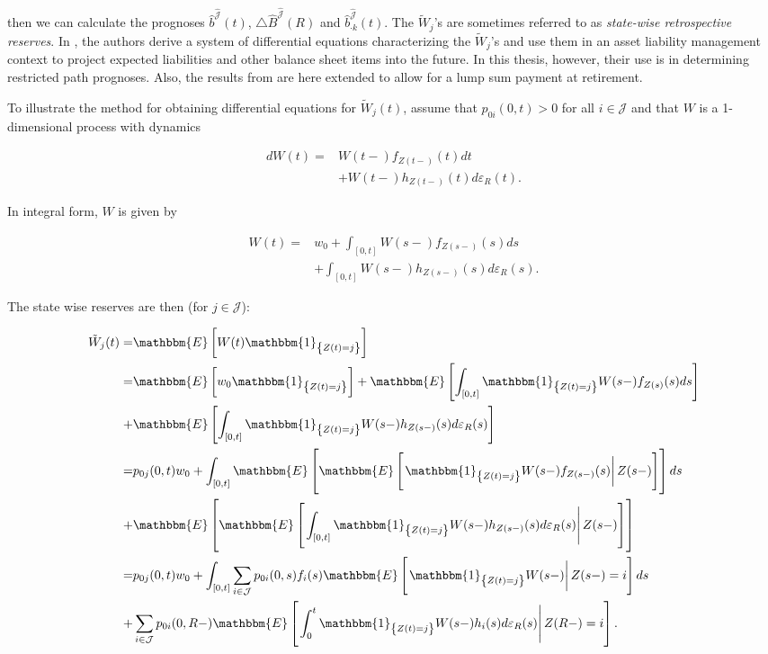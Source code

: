 \documentclass{article}
\newcommand{\1}[1]{\mathbbm{1}_{\left\lbrace #1 \right\rbrace}}
\newcommand{\expec}[1][def]{\mathbbm{E} \left[ #1 \right]}
\newcommand{\econd}[2][def]{\mathbbm{E} \left[ \left. #1 \right| #2 \right]}
\theoremstyle{break}
\theoremstyle{remark}
\numberwithin{equation}{section}
\begin{document}
then we can calculate the prognoses $\hat{b}^{\hat{\mathcal{J}}}(t)$, $\triangle \hat{B}^{\hat{\mathcal{J}}}(R)$ and $\hat{b}_{\cdot k}^{\hat{\mathcal{J}}}(t)$. The $\tilde{W}_j$'s are sometimes referred to as \textit{state-wise retrospective reserves}. In \cite{Lollike}, the authors derive a system of differential equations characterizing the $\tilde{W}_j$'s and use them in an asset liability management context to project expected liabilities and other balance sheet items into the future. In this thesis, however, their use is in determining restricted path prognoses. Also, the results from \cite{Lollike} are here extended to allow for a lump sum payment at retirement.

To illustrate the method for obtaining differential equations for $\tilde{W}_j(t)$, assume that $p_{0i}(0,t)>0$ for all $i \in \mathcal{J}$ and that $W$ is a 1-dimensional process with dynamics

\begin{align*}
	dW(t) =& W(t-) f_{Z(t-)}(t) dt \\
	&+ W(t-) h_{Z(t-)}(t) d \varepsilon_{R}(t).
\end{align*}

In integral form, $W$ is given by

\begin{align*}
	W(t) =& w_0 + \int_{\left[ 0,t \right]} W(s-) f_{Z(s-)}(s) ds \\
	&+ \int_{\left[ 0,t \right]} W(s-) h_{Z(s-)}(s) d \varepsilon_{R}(s).
\end{align*}

The state wise reserves are then (for $j \in \mathcal{J}$):

\begin{align} \label{SkalBruges}
	\tilde{W}_j(t) =& \expec[W(t) \1{Z(t)=j}] \nonumber \\
	=& \expec[w_0 \1{Z(t)=j}] + \expec[\int_{\left[ 0,t \right]} \1{Z(t)=j} W(s-) f_{Z(s)}(s) ds] \nonumber \\
	+& \expec[\int_{\left[ 0,t \right]} \1{Z(t)=j} W(s-) h_{Z(s-)}(s) d \varepsilon_{R}(s)] \nonumber \\
	=& p_{0j}(0,t) w_0 + \int_{\left[ 0,t \right]} \mathbbm{E} \left[ \econd[\1{Z(t)=j} W(s-) f_{Z(s-)}(s)]{Z(s-)} \right]ds \nonumber \\
	+& \mathbbm{E} \left[ \econd[ \int_{\left[ 0,t \right]} \1{Z(t)=j} W(s-) h_{Z(s-)}(s) d \varepsilon_{R}(s) ]{Z(s-)} \right] \nonumber \\
	=& p_{0j}(0,t) w_0 + \int_{\left[ 0,t \right]} \sum_{i \in \mathcal{J}} p_{0i}(0,s) f_{i}(s) \econd[\1{Z(t)=j} W(s-)]{Z(s-)=i} ds \\
	+& \sum_{i \in \mathcal{J}} p_{0i}(0,R-) \econd[\int_0^t \1{Z(t)=j} W(s-) h_{i}(s) d \varepsilon_{R}(s)]{Z(R-)=i}. \nonumber
\end{align}
\end{document}
